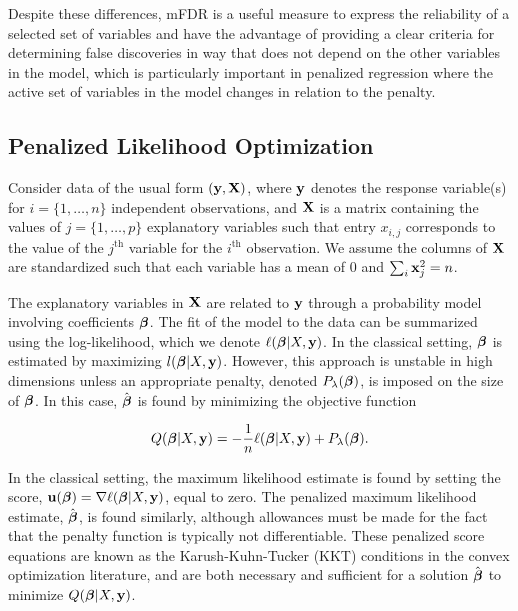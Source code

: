 Despite these differences, mFDR is a useful measure to express the reliability of a selected set of variables and have the advantage of providing a clear criteria for determining false discoveries in way that does not depend on the other variables in the model, which is particularly important in penalized regression where the active set of variables in the model changes in relation to the penalty.

\subsection{Penalized Likelihood Optimization}

Consider data of the usual form $(\mathbf{y}, \mathbf{X})$, where $\mathbf{y}$ denotes the response variable(s) for $i = \{1, \ldots, n\}$ independent observations, and $\mathbf{X}$ is a matrix containing the values of $j = \{1, \ldots, p\}$ explanatory variables such that entry $x_{i,j}$ corresponds to the value of the $j^{\textrm{th}}$ variable for the $i^{\textrm{th}}$ observation.  We assume the columns of $\mathbf{X}$ are standardized such that each variable has a mean of $0$ and $\sum_i \mathbf{x}_j^2 = n$.

The explanatory variables in $\mathbf{X}$ are related to $\mathbf{y}$ through a probability model involving coefficients $\boldsymbol{\beta}$.  The fit of the model to the data can be summarized using the log-likelihood, which we denote $\ell(\boldsymbol{\beta}|X,\mathbf{y})$.  In the classical setting, $\boldsymbol{\beta}$ is estimated by maximizing $l(\boldsymbol{\beta}|X,\mathbf{y})$.  However, this approach is unstable in high dimensions unless an appropriate penalty, denoted $P_{\lambda}(\boldsymbol{\beta})$, is imposed on the size of $\boldsymbol{\beta}$.
In this case, $\hat{\boldsymbol{\beta}}$ is found by minimizing the objective function

\begin{equation*}
 Q(\boldsymbol{\beta}|X,\mathbf{y}) =  -\frac{1}{n} \ell(\boldsymbol{\beta}|X,\mathbf{y}) + P_{\lambda} (\boldsymbol{\beta}).
\end{equation*}

In the classical setting, the maximum likelihood estimate is found by setting the score, $\mathbf{u}(\boldsymbol{\beta}) = \nabla \ell(\boldsymbol{\beta}|X,\mathbf{y})$, equal to zero.  The penalized maximum likelihood estimate, $\hat{\boldsymbol{\beta}}$, is found similarly, although allowances must be made for the fact that the penalty function is typically not differentiable.  These penalized score equations are known as the Karush-Kuhn-Tucker (KKT) conditions in the convex optimization literature, and are both necessary and sufficient for a solution $\hat{\boldsymbol{\beta}}$ to minimize $Q(\boldsymbol{\beta}|X,\mathbf{y})$.

